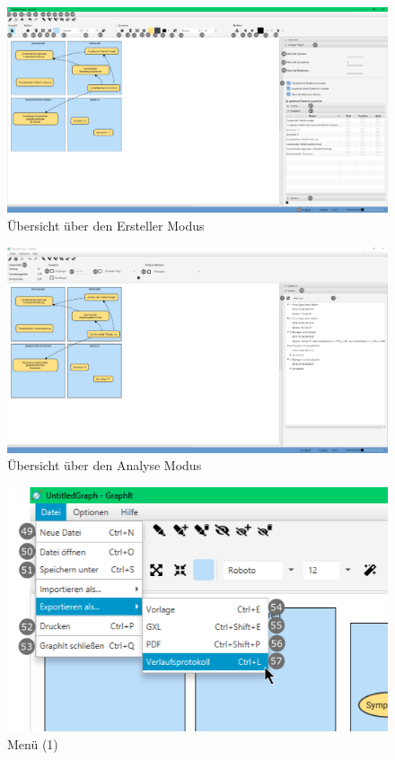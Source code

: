 \documentclass[enabledeprecatedfontcommands,fontsize=11pt,paper=a4,twoside]{scrartcl}
\begin{document}
\begin{landscape}
	\begin{figure}
		\centering
		\includegraphics[width=22cm]{over.png}
		\caption{Übersicht über den Ersteller Modus}
	\end{figure}
\end{landscape}
\begin{landscape}
	\begin{figure}
		\centering
		\includegraphics[width=22cm]{over2.png}
		\caption{Übersicht über den Analyse Modus}
	\end{figure}
\end{landscape}

\begin{figure}[ht!]
	\centering
	\includegraphics[width=0.5\columnwidth, keepaspectratio]{menu1.png} 
	\caption{Menü (1)}
\end{figure}
\end{document}
